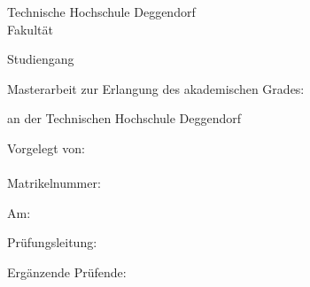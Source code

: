 \begin{titlepage}
\begin{center}
	{
	Technische Hochschule Deggendorf\\
	Fakultät \faculty\par}
	\vspace{.2cm}
{\Large Studiengang \studies\\}
\vspace{6\baselineskip}
{\Huge{}\thesistitleDE\par}
\vspace{1cm}
{\Huge{}\thesistitleEN\par}
\vspace{6\baselineskip}

Masterarbeit zur Erlangung des akademischen Grades:

	\vspace{.2cm}
	\emph{\degree}
	\vspace{.2cm}

an der Technischen Hochschule Deggendorf\\
\end{center}
\vfill
\parbox[t]{.4\textwidth}{
	Vorgelegt von:\\
	\student\\
	Matrikelnummer:  \matrnr\par
	\vspace{\baselineskip}
	Am: \submissiondate\par
}
\hfill
\parbox[t]{.4\textwidth}{
Prüfungsleitung:\\
\supervisor%

\ifthenelse{\equal{\secsupervisor}{}}{}
{%
\vspace{\baselineskip}
Ergänzende Prüfende:\\
\secsupervisor%
}}
\end{titlepage}
\cleardoublepage\par
